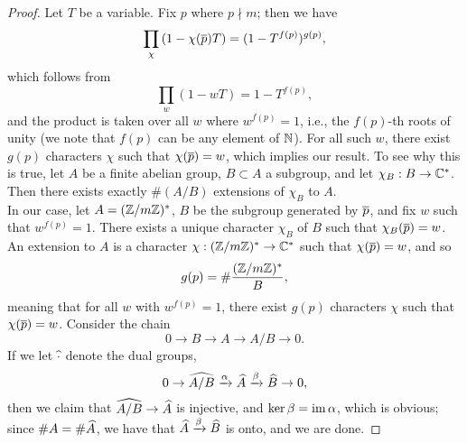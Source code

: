 \begin{proof}
    Let $T$ be a variable. Fix $p$ where $p \nmid m$; then we have
    \[ \prod_\chi \left(1 - \chi(\overline p) T\right) = (1 - T^{f(p)})^{g(p)}, \]
    which follows from
    \[ \prod_w (1 - w T) = 1 - T^{f(p)}, \]
    and the product is taken over all $w$ where $w^{f(p)} = 1$, i.e., the $f(p)$-th roots of unity (we note that $f(p)$ can be any element of $\mathbb N$). For all such $w$, there exist $g(p)$ characters $\chi$ such that $\chi(\overline p) = w$, which implies our result. To see why this is true, let $A$ be a finite abelian group, $B \subset A$ a subgroup, and let $\chi_B : B \to \mathbb C^\ast$. Then there exists exactly $\#(A/B)$ extensions of $\chi_B$ to $A$.
    \\[8pt]
    In our case, let $A = (\mathbb Z/m\mathbb Z)^\ast$, $B$ be the subgroup generated by $\overline p$, and fix $w$ such that $w^{f(p)} = 1$. There exists a unique character $\chi_B$ of $B$ such that $\chi_B(\overline p) = w$. An extension to $A$ is a character $\chi : (\mathbb Z/m\mathbb Z)^\ast \to \mathbb C^\ast$ such that $\chi(\overline p) = w$, and so
    \[ g(p) = \# \frac{(\mathbb Z/m\mathbb Z)^\ast}{B}, \]
    meaning that for all $w$ with $w^{f(p)} = 1$, there exist $g(p)$ characters $\chi$ such that $\chi(\overline p) = w$. Consider the chain
    \[ 0 \to B \to A \to A/B \to 0. \]
    If we let $\widehat \cdot$ denote the dual groups,
    \[ 0 \to \widehat{A/B} \xrightarrow{\alpha} \widehat A \xrightarrow{\beta} \widehat B \to 0, \]
    then we claim that $\widehat{A/B} \to \widehat{A}$ is injective, and $\ker \beta = \operatorname{im} \alpha$, which is obvious; since $\# A = \# \widehat A$, we have that $\widehat A \xrightarrow{\beta} \widehat B$ is onto, and we are done.
\end{proof}
